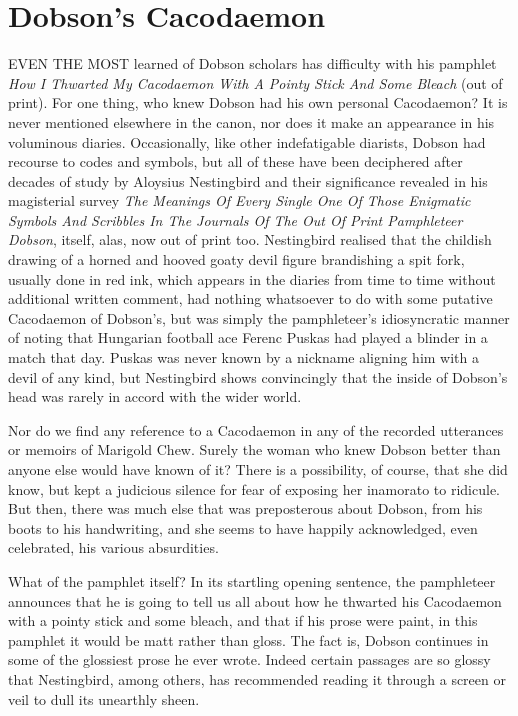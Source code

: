 \chapter{Dobson's Cacodaemon}

EVEN THE MOST learned of Dobson scholars has difficulty with his pamphlet \emph{How I Thwarted My Cacodaemon With A Pointy Stick And Some Bleach} (out of print). For one thing, who knew Dobson had his own personal Cacodaemon? It is never mentioned elsewhere in the canon, nor does it make an appearance in his voluminous diaries. Occasionally, like other indefatigable diarists, Dobson had recourse to codes and symbols, but all of these have been deciphered after decades of study by Aloysius Nestingbird and their significance revealed in his magisterial survey \emph{The Meanings Of Every Single One Of Those Enigmatic Symbols And Scribbles In The Journals Of The Out Of Print Pamphleteer Dobson}, itself, alas, now out of print too. Nestingbird realised that the childish drawing of a horned and hooved goaty devil figure brandishing a spit fork, usually done in red ink, which appears in the diaries from time to time without additional written comment, had nothing whatsoever to do with some putative Cacodaemon of Dobson's, but was simply the pamphleteer's idiosyncratic manner of noting that Hungarian football ace Ferenc Puskas had played a blinder in a match that day. Puskas was never known by a nickname aligning him with a devil of any kind, but Nestingbird shows convincingly that the inside of Dobson's head was rarely in accord with the wider world.

Nor do we find any reference to a Cacodaemon in any of the recorded utterances or memoirs of Marigold Chew. Surely the woman who knew Dobson better than anyone else would have known of it? There is a possibility, of course, that she did know, but kept a judicious silence for fear of exposing her inamorato to ridicule. But then, there was much else that was preposterous about Dobson, from his boots to his handwriting, and she seems to have happily acknowledged, even celebrated, his various absurdities.

What of the pamphlet itself? In its startling opening sentence, the pamphleteer announces that he is going to tell us all about how he thwarted his Cacodaemon with a pointy stick and some bleach, and that if his prose were paint, in this pamphlet it would be matt rather than gloss. The fact is, Dobson continues in some of the glossiest prose he ever wrote. Indeed certain passages are so glossy that Nestingbird, among others, has recommended reading it through a screen or veil to dull its unearthly sheen.

